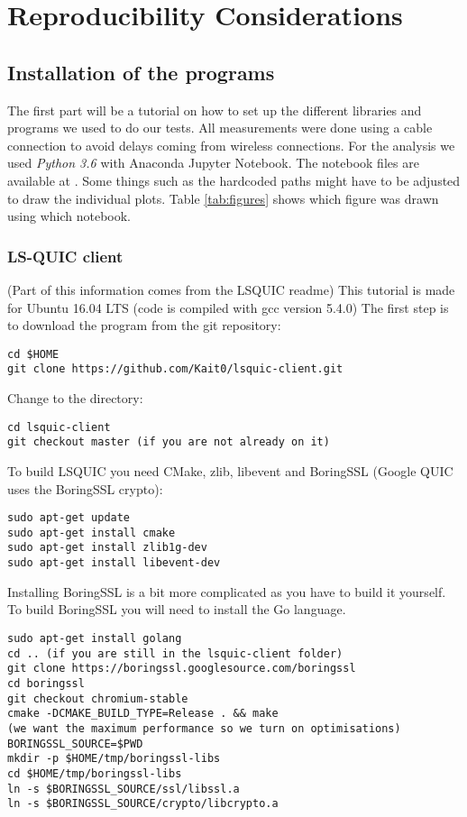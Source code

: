 \chapter{Reproducibility Considerations}\label{chapter:Reproducibility}

\section{Installation of the programs}
The first part will be a tutorial on how to set up the different libraries and programs we used to do our tests.
All measurements were done using a cable connection to avoid delays coming from wireless connections.
For the analysis we used \textit{Python 3.6} with Anaconda Jupyter Notebook.
The notebook files are available at \cite{Link:pythonFiles}. 
Some things such as the hardcoded paths might have to be adjusted to draw the individual plots.
Table \ref{tab:figures} shows which figure was drawn using which notebook.

\subsection{LS-QUIC client}
(Part of this information comes from the LSQUIC readme)
This tutorial is made for Ubuntu 16.04 LTS (code is compiled with gcc version 5.4.0)
The first step is to download the program from the git repository:
\begin{lstlisting}
cd $HOME
git clone https://github.com/Kait0/lsquic-client.git
\end{lstlisting}

Change to the directory:
\begin{lstlisting}
cd lsquic-client
git checkout master (if you are not already on it)
\end{lstlisting}

To build LSQUIC you need CMake, zlib, libevent and BoringSSL (Google QUIC uses the BoringSSL crypto):
\begin{lstlisting}
sudo apt-get update
sudo apt-get install cmake
sudo apt-get install zlib1g-dev
sudo apt-get install libevent-dev
\end{lstlisting}

Installing BoringSSL is a bit more complicated as you have to build it yourself.
To build BoringSSL you will need to install the Go language.
\begin{lstlisting}
sudo apt-get install golang
cd .. (if you are still in the lsquic-client folder)
git clone https://boringssl.googlesource.com/boringssl
cd boringssl
git checkout chromium-stable
cmake -DCMAKE_BUILD_TYPE=Release . && make 
(we want the maximum performance so we turn on optimisations)
BORINGSSL_SOURCE=$PWD
mkdir -p $HOME/tmp/boringssl-libs
cd $HOME/tmp/boringssl-libs
ln -s $BORINGSSL_SOURCE/ssl/libssl.a
ln -s $BORINGSSL_SOURCE/crypto/libcrypto.a
\end{lstlisting}

